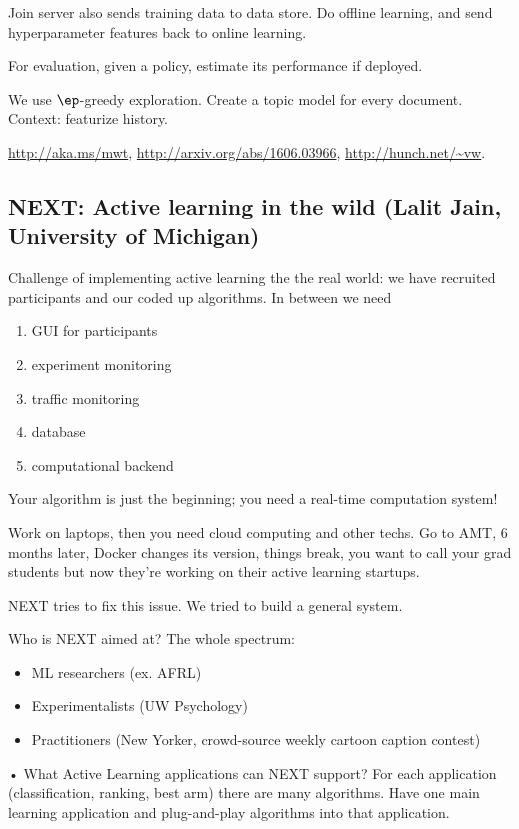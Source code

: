 Join server also sends training data to data store. Do offline learning, and send hyperparameter features back to online learning.

For evaluation, given a policy, estimate its performance if deployed.

We use $\ep$-greedy exploration. Create a topic model for every document. Context: featurize history.

\url{http://aka.ms/mwt}, \url{http://arxiv.org/abs/1606.03966}, \url{http://hunch.net/~vw}.

\subsection{NEXT: Active learning in the wild (Lalit Jain, University of Michigan)}

Challenge of implementing active learning the the real world: we have recruited participants and our coded up algorithms. In between we need
\begin{enumerate}
\item
GUI for participants
\item
experiment monitoring
\item
traffic monitoring
\item
database
\item
computational backend
\end{enumerate}
Your algorithm is just the beginning; you need a real-time computation system!

Work on laptops, then you need cloud computing and other techs.  Go to AMT, 6 months later, Docker changes its version, things break, you want to call your grad students but now they're working on their active learning startups.

NEXT tries to fix this issue. We tried to build a general system. 

Who is NEXT aimed at? The whole spectrum:
\begin{itemize}
\item
ML researchers (ex. AFRL)
\item
Experimentalists (UW Psychology)
\item
Practitioners (New Yorker, crowd-source weekly cartoon caption contest)
\end{itemize}•
What Active Learning applications can NEXT support?
For each application (classification, ranking, best arm) there are many algorithms. Have one main learning application and plug-and-play algorithms into that application.

